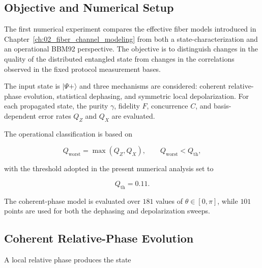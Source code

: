 
\subsection{Objective and Numerical Setup}

The first numerical experiment compares the effective fiber models introduced in
Chapter~\ref{ch:02_fiber_channel_modeling} from both a state-characterization
and an operational BBM92 perspective. The objective is to distinguish changes in
the quality of the distributed entangled state from changes in the correlations
observed in the fixed protocol measurement bases.

The input state is \(|\Psi+\rangle\) and three mechanisms are considered: coherent relative-phase evolution, statistical
dephasing, and symmetric local depolarization. For each propagated state, the
purity \(\gamma\), fidelity \(F\), concurrence \(C\), and basis-dependent error
rates \(Q_Z\) and \(Q_X\) are evaluated.

The operational classification is based on

\begin{equation}
Q_{\mathrm{worst}}
=
\max\left(Q_Z,Q_X\right),
\qquad
Q_{\mathrm{worst}}<Q_{\mathrm{th}},
\label{eq:exp1_operating_condition}
\end{equation}

with the threshold adopted in the present numerical analysis set to

\begin{equation}
Q_{\mathrm{th}}=0.11.
\label{eq:exp1_qber_threshold}
\end{equation}

The coherent-phase model is evaluated over \(181\) values of
\(\theta\in[0,\pi]\), while \(101\) points are used for both the dephasing and
depolarization sweeps.


\subsection{Coherent Relative-Phase Evolution}

A local relative phase produces the state


